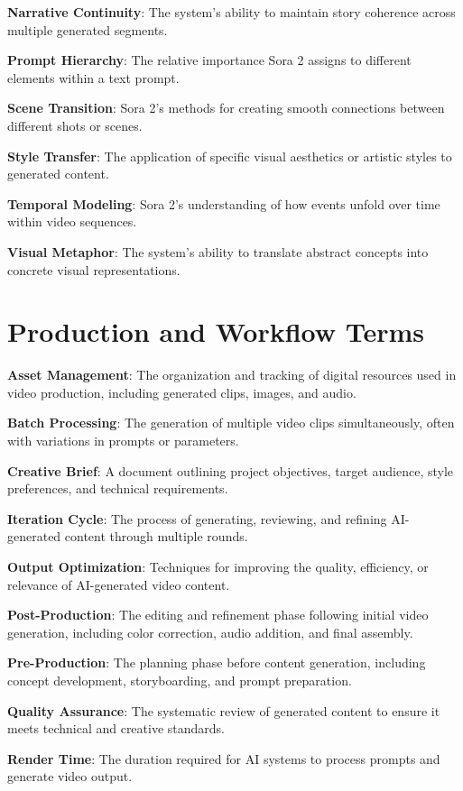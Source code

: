 \textbf{Narrative Continuity}: The system's ability to maintain story coherence across multiple generated segments.

\textbf{Prompt Hierarchy}: The relative importance Sora 2 assigns to different elements within a text prompt.

\textbf{Scene Transition}: Sora 2's methods for creating smooth connections between different shots or scenes.

\textbf{Style Transfer}: The application of specific visual aesthetics or artistic styles to generated content.

\textbf{Temporal Modeling}: Sora 2's understanding of how events unfold over time within video sequences.

\textbf{Visual Metaphor}: The system's ability to translate abstract concepts into concrete visual representations.

\section{Production and Workflow Terms}

\textbf{Asset Management}: The organization and tracking of digital resources used in video production, including generated clips, images, and audio.

\textbf{Batch Processing}: The generation of multiple video clips simultaneously, often with variations in prompts or parameters.

\textbf{Creative Brief}: A document outlining project objectives, target audience, style preferences, and technical requirements.

\textbf{Iteration Cycle}: The process of generating, reviewing, and refining AI-generated content through multiple rounds.

\textbf{Output Optimization}: Techniques for improving the quality, efficiency, or relevance of AI-generated video content.

\textbf{Post-Production}: The editing and refinement phase following initial video generation, including color correction, audio addition, and final assembly.

\textbf{Pre-Production}: The planning phase before content generation, including concept development, storyboarding, and prompt preparation.

\textbf{Quality Assurance}: The systematic review of generated content to ensure it meets technical and creative standards.

\textbf{Render Time}: The duration required for AI systems to process prompts and generate video output.

